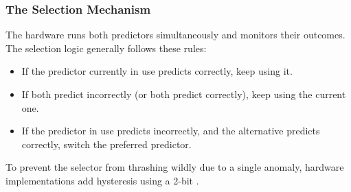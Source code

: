 \subsubsection*{The Selection Mechanism}
The hardware runs both predictors simultaneously and monitors their outcomes. The selection logic generally follows these rules:
\begin{itemize}
    \item If the predictor currently in use predicts correctly, keep using it.
    \item If both predict incorrectly (or both predict correctly), keep using the current one.
    \item If the predictor in use predicts incorrectly, and the alternative predicts correctly, switch the preferred predictor.
\end{itemize}

To prevent the selector from thrashing wildly due to a single anomaly, hardware implementations add hysteresis using a 2-bit . 

